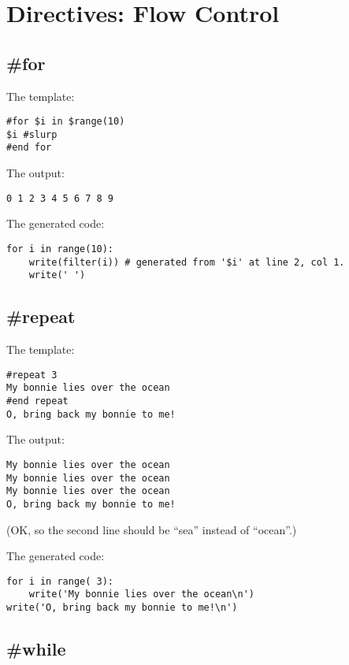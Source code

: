 \section{Directives: Flow Control}
\label{flowControl}

\subsection{\#for}
\label{flowControl.for}

The template:
\begin{verbatim}
#for $i in $range(10)
$i #slurp
#end for
\end{verbatim}

The output:
\begin{verbatim}
0 1 2 3 4 5 6 7 8 9 
\end{verbatim}

The generated code:
\begin{verbatim}
for i in range(10):
    write(filter(i)) # generated from '$i' at line 2, col 1.
    write(' ')
\end{verbatim}

\subsection{\#repeat}
\label{flowControl.repeat}

The template:
\begin{verbatim}
#repeat 3
My bonnie lies over the ocean
#end repeat
O, bring back my bonnie to me!
\end{verbatim}

The output:
\begin{verbatim}
My bonnie lies over the ocean
My bonnie lies over the ocean
My bonnie lies over the ocean
O, bring back my bonnie to me!
\end{verbatim}
(OK, so the second line should be ``sea'' instead of ``ocean''.)

The generated code:
\begin{verbatim}
for i in range( 3):
    write('My bonnie lies over the ocean\n')
write('O, bring back my bonnie to me!\n')
\end{verbatim}


\subsection{\#while}
\label{flowControl.while}

